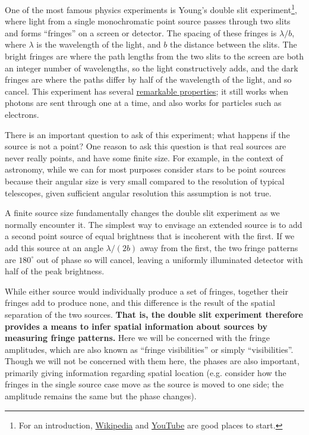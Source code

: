 \documentclass[11pt]{article}
\begin{document}
One of the most famous physics experiments is Young's double slit experiment\footnote{For an introduction, \href{https://en.wikipedia.org/wiki/Double-slit_experiment}{Wikipedia} and \href{https://www.youtube.com/watch?v=A9tKncAdlHQ}{YouTube} are good places to start.}, where light from a single monochromatic point source passes through two slits and forms ``fringes'' on a screen or detector. The spacing of these fringes is $\lambda/b$, where $\lambda$ is the wavelength of the light, and $b$ the distance between the slits. The bright fringes are where the path lengths from the two slits to the screen are both an integer number of wavelengths, so the light constructively adds, and the dark fringes are where the paths differ by half of the wavelength of the light, and so cancel. This experiment has several \href{https://en.wikipedia.org/wiki/Double-slit_experiment}{remarkable properties}; it still works when photons are sent through one at a time, and also works for particles such as electrons.

There is an important question to ask of this experiment; what happens if the source is not a point? One reason to ask this question is that real sources are never really points, and have some finite size. For example, in the context of astronomy, while we can for most purposes consider stars to be point sources because their angular size is very small compared to the resolution of typical telescopes, given sufficient angular resolution this assumption is not true.

A finite source size fundamentally changes the double slit experiment as we normally encounter it. The simplest way to envisage an extended source is to add a second point source of equal brightness that is incoherent with the first. If we add this source at an angle $\lambda/(2b)$ away from the first, the two fringe patterns are $180^\circ$ out of phase so will cancel, leaving a uniformly illuminated detector with half of the peak brightness.

\clearpage

While either source would individually produce a set of fringes, together their fringes add to produce none, and this difference is the result of the spatial separation of the two sources. \textbf{That is, the double slit experiment therefore provides a means to infer spatial information about sources by measuring fringe patterns.} Here we will be concerned with the fringe amplitudes, which are also known as ``fringe visibilities'' or simply ``visibilities''. Though we will not be concerned with them here, the phases are also important, primarily giving information regarding spatial location (e.g. consider how the fringes in the single source case move as the source is moved to one side; the amplitude remains the same but the phase changes).
\end{document}
